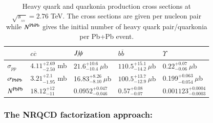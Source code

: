 \documentclass[review]{elsarticle}
\newcommand{\Jpsi}{\ensuremath{J\hspace{-.08em}/\hspace{-.14em}\psi}\xspace} %
\begin{document}
\begin{table}
\caption[]{Heavy quark and quarkonia production  cross sections at
$\sqrt{s_{_{_{NN}}}}= 2.76$ TeV. The cross sections are given per nucleon pair while
$N^{\rm PbPb}$ gives the initial number of heavy quark pair/quarkonia per Pb+Pb event.}
\label{NLOcros}
\begin{tabular}{l|l|l|l|l} 
\hline 
\hline
             & $ c \overline c$            &$\Jpsi$                      & $ b \overline b$                    & $\Upsilon$   \\              
\hline
$\sigma_{pp}$ & $4.11^{+2.69}_{-2.50}$ mb    & $21.6^{+10.6}_{-10.4}~\mu$b   & $110.5^{+15.1}_{-14.2}~\mu$b            & $0.22^{+0.07}_{-0.06}~\mu$b  \\


$\sigma_{\rm PbPb}$ & $3.21^{+2.1}_{-1.95}$ mb    &16.83$^{+8.26}_{-8.10}~\mu$b    & $100.5^{+13.7}_{-12.9}~\mu$b             & 0.199$^{+0.063}_{-0.054}~\mu$b  \\



$N^{\rm PbPb}$     & $18.12^{+12}_{-11}$       & $0.0952^{+0.047}_{-0.046}$         & $0.57^{+0.08}_{-0.07}$                          & $0.001123^{+0.0004}_{-0.0003}$       \\

\hline
\hline
\end{tabular}
\end{table}






\subsubsection{The NRQCD factorization approach:}
\end{document}
